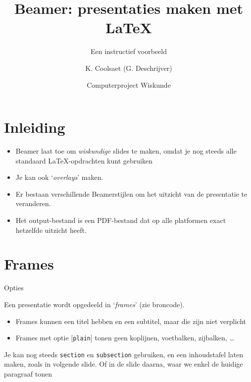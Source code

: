 \documentclass{beamer} %
\title[Beamer]{Beamer: presentaties maken met \LaTeX}
\subtitle{Een instructief voorbeeld}
\date[2020--2021]{Computerproject Wiskunde}
\author[K. Coolsaet]{K. Coolsaet (G. Deschrijver)}
\institute[UGent]{Universiteit Gent}
\begin{document}
\begin{frame}[plain]
\titlepage
\end{frame}


\section{Inleiding}

\begin{frame}{\secname} %
  \begin{itemize}
  \item Beamer laat toe om \emph{wiskundige} slides te maken, omdat je nog
  steeds alle standaard \LaTeX-opdrachten kunt gebruiken
  \pause
  \item Je kan ook `\emph{overlays}' maken.
  \pause
  \item Er bestaan verschillende Beamerstijlen om het
  uitzicht van de presentatie te veranderen.
  \pause
  \item Het output-bestand is een PDF-bestand dat op alle platformen exact
  hetzelfde uitzicht heeft.
  \end{itemize}
\end{frame}


\section{Frames}

\begin{frame}{\secname}{Opties}

Een presentatie wordt opgedeeld in `\emph{frames}' (zie broncode).
  \pause  
  \begin{itemize}
  \item Frames kunnen een titel hebben en een subtitel, maar die zijn niet
  verplicht
  \pause
  \item Frames met optie [\texttt{plain}] tonen geen koplijnen, voetbalken,
  zijbalken, \dots
  \end{itemize}
\pause
Je kan nog steeds \texttt{section} en \texttt{subsection} gebruiken, en een
inhoudstafel laten maken, zoals in volgende slide.
\pause
Of in de slide daarna, waar we enkel de huidige paragraaf tonen
\end{frame}
\end{document}
